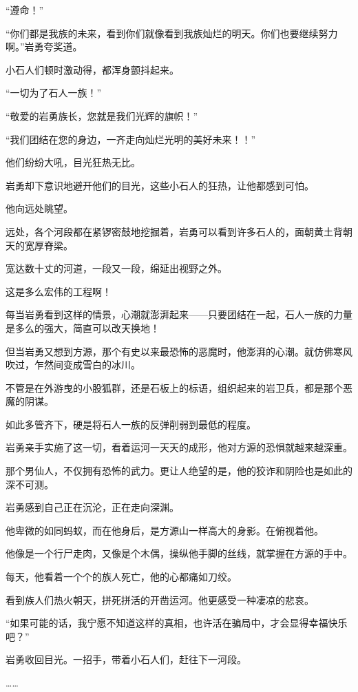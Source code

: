 \begin{this_body}
“遵命！”

“你们都是我族的未来，看到你们就像看到我族灿烂的明天。你们也要继续努力啊。”岩勇夸奖道。

小石人们顿时激动得，都浑身颤抖起来。

“一切为了石人一族！”

“敬爱的岩勇族长，您就是我们光辉的旗帜！”

“我们团结在您的身边，一齐走向灿烂光明的美好未来！！”

他们纷纷大吼，目光狂热无比。

岩勇却下意识地避开他们的目光，这些小石人的狂热，让他都感到可怕。

他向远处眺望。

远处，各个河段都在紧锣密鼓地挖掘着，岩勇可以看到许多石人的，面朝黄土背朝天的宽厚脊梁。

宽达数十丈的河道，一段又一段，绵延出视野之外。

这是多么宏伟的工程啊！

每当岩勇看到这样的情景，心潮就澎湃起来——只要团结在一起，石人一族的力量是多么的强大，简直可以改天换地！

但当岩勇又想到方源，那个有史以来最恐怖的恶魔时，他澎湃的心潮。就仿佛寒风吹过，乍然间变成雪白的冰川。

不管是在外游曳的小股狐群，还是石板上的标语，组织起来的岩卫兵，都是那个恶魔的阴谋。

如此多管齐下，硬是将石人一族的反弹削弱到最低的程度。

岩勇亲手实施了这一切，看着运河一天天的成形，他对方源的恐惧就越来越深重。

那个男仙人，不仅拥有恐怖的武力。更让人绝望的是，他的狡诈和阴险也是如此的深不可测。

岩勇感到自己正在沉沦，正在走向深渊。

他卑微的如同蚂蚁，而在他身后，是方源山一样高大的身影。在俯视着他。

他像是一个行尸走肉，又像是个木偶，操纵他手脚的丝线，就掌握在方源的手中。

每天，他看着一个个的族人死亡，他的心都痛如刀绞。

看到族人们热火朝天，拼死拼活的开凿运河。他更感受一种凄凉的悲哀。

“如果可能的话，我宁愿不知道这样的真相，也许活在骗局中，才会显得幸福快乐吧？”

岩勇收回目光。一招手，带着小石人们，赶往下一河段。

……


\end{this_body}
